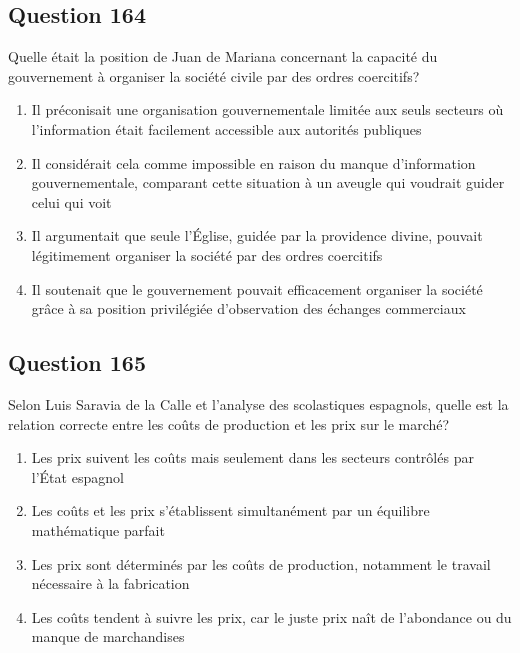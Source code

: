 \documentclass[12pt,a4paper]{article}
\begin{document}
\bigskip


\subsection*{Question 164}
Quelle était la position de Juan de Mariana concernant la capacité du gouvernement à organiser la société civile par des ordres coercitifs?

\begin{enumerate}[label=\Alph*., leftmargin=*]
\item Il préconisait une organisation gouvernementale limitée aux seuls secteurs où l'information était facilement accessible aux autorités publiques
\item Il considérait cela comme impossible en raison du manque d'information gouvernementale, comparant cette situation à un aveugle qui voudrait guider celui qui voit
\item Il argumentait que seule l'Église, guidée par la providence divine, pouvait légitimement organiser la société par des ordres coercitifs
\item Il soutenait que le gouvernement pouvait efficacement organiser la société grâce à sa position privilégiée d'observation des échanges commerciaux
\end{enumerate}

\bigskip


\subsection*{Question 165}
Selon Luis Saravia de la Calle et l'analyse des scolastiques espagnols, quelle est la relation correcte entre les coûts de production et les prix sur le marché?

\begin{enumerate}[label=\Alph*., leftmargin=*]
\item Les prix suivent les coûts mais seulement dans les secteurs contrôlés par l'État espagnol
\item Les coûts et les prix s'établissent simultanément par un équilibre mathématique parfait
\item Les prix sont déterminés par les coûts de production, notamment le travail nécessaire à la fabrication
\item Les coûts tendent à suivre les prix, car le juste prix naît de l'abondance ou du manque de marchandises
\end{enumerate}

\bigskip
\end{document}
